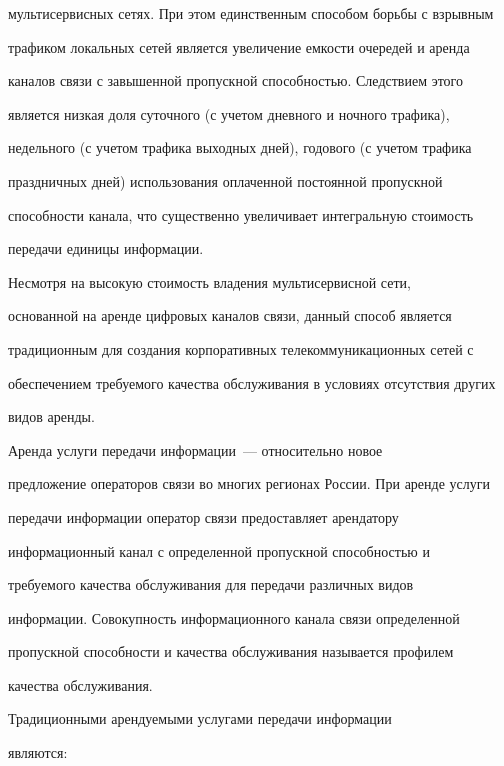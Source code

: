 мультисервисных сетях. При этом единственным способом борьбы с взрывным 


трафиком локальных сетей является увеличение емкости очередей и аренда 


каналов связи с завышенной пропускной способностью. Следствием этого 


является низкая доля суточного (с учетом дневного и ночного трафика), 


недельного (с учетом трафика выходных дней), годового (с учетом трафика 


праздничных дней) использования оплаченной постоянной пропускной 


способности канала, что существенно увеличивает интегральную стоимость 


передачи единицы информации.


      


      Несмотря на высокую стоимость владения мультисервисной сети, 


основанной на аренде цифровых каналов связи, данный способ является 


традиционным для создания корпоративных телекоммуникационных сетей с 


обеспечением тре\-бу\-емо\-го качества обслуживания в условиях отсутствия других 


видов аренды.


      


      Аренда услуги передачи информации~--- относительно новое 


предложение операторов связи во многих регионах России. При аренде услуги 


передачи информации оператор связи предоставляет арендатору 


информационный канал с определенной пропускной способностью и 


требуемого качества обслуживания для передачи различных видов 


информации. Совокупность информационного канала связи определенной 


пропускной способности и качества обслуживания называется профилем 


качества обслуживания.


      


      Традиционными арендуемыми услугами передачи информации 


являются:


